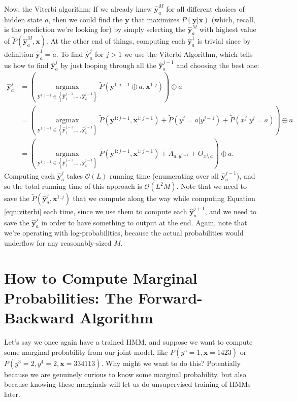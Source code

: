 \documentclass{article}
\DeclareMathOperator{\argmax}{argmax}
\newcommand{\Yh}{\hat{\textbf{y}}}
\newcommand{\Pt}{\tilde{P}}
\newcommand{\At}{\tilde{A}}
\newcommand{\Ot}{\tilde{O}}
\newcommand{\bigO}{\mathcal{O}}
\newcommand{\x}{\textbf{x}}
\newcommand{\y}{\textbf{y}}
\begin{document}
Now, the Viterbi algorithm: If we already knew $\Yh^M_a$ for all different choices of hidden state $a$, then we could find the $\y$ that maximizes $P(\y|\x)$ (which, recall, is the prediction we're looking for) by simply selecting the $\Yh^M_a$ with highest value of $\Pt(\Yh^M_a,\x)$.  
At the other end of things, computing each $\Yh_a^1$ is trivial since by definition $\Yh_a^1 = a$.  To find $\Yh^j_a$ for $j > 1$ we use the Viterbi Algorithm, which tells us how to find $\Yh^j_a$ by just looping through all the $\Yh^{j-1}_a$ and choosing the best one:
\begin{align}
\Yh^j_a &= \left(\underset{\y^{1:j-1} \in \left\{\Yh^{j-1}_1,\ldots,\Yh^{j-1}_L\right\}}{\argmax} \Pt(\y^{1:j-1}\oplus a,\x^{1:j})\right) \oplus a\label{eqn:viterbi}\\
       & = \left(\underset{\y^{1:j-1} \in \left\{\Yh^{j-1}_1,\ldots,\Yh^{j-1}_L\right\}}{\argmax} \Pt(\y^{1:j-1},\x^{1:j-1}) + \Pt(y^j=a|y^{j-1}) + \Pt(x^j|y^j=a)\right) \oplus a\nonumber\\
       & = \left(\underset{\y^{1:j-1} \in \left\{\Yh^{j-1}_1,\ldots,\Yh^{j-1}_L\right\}}{\argmax} \Pt(\y^{1:j-1},\x^{1:j-1}) + \At_{a,y^{j-1}} + \Ot_{x^j,a}\right) \oplus a\nonumber.
\end{align}
Computing each $\Yh_a^j$ takes $\bigO(L)$ running time (enumerating over all $\Yh_a^{j-1}$), and so the total running time of this approach is $\bigO(L^2M)$.  Note that we need to save the $\Pt(\Yh_a^j,\x^{1:j})$ that we compute along the way while computing Equation \ref{eqn:viterbi} each time, since we use them to compute each $\Yh_a^{j+1}$, and we need to save the $\Yh_a^j$ in order to have something to output at the end.  Again, note that we're operating with log-probabilities, because the actual probabilities would underflow for any reasonably-sized $M$.


\section{How to Compute Marginal Probabilities: The Forward-Backward Algorithm}

Let's say we once again have a trained HMM, and suppose we  want to compute some marginal probability from our joint model, like $P(y^5=1,\x = 1423)$ or $P(y^3=2, y^4=2,\x = 334113)$.  Why might we want to do this?  Potentially because we are genuinely curious to know some marginal probability, but also because knowing these marginals will let us do unsupervised training of HMMs later.
\end{document}
